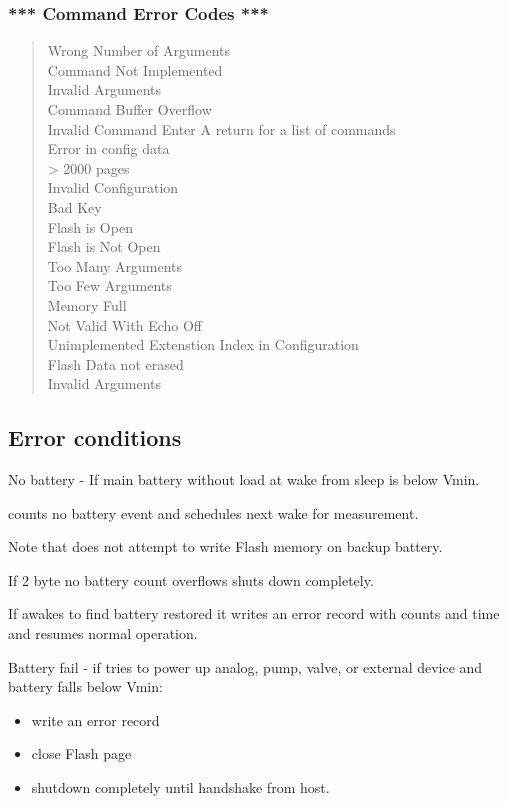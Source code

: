 \subsubsection*{*** Command Error Codes ***}
\begin{quote}
	 Wrong Number of Arguments\\
	 Command Not Implemented\\
	 Invalid Arguments\\
	 Command Buffer Overflow\\
	 Invalid Command Enter A return for a list of commands\\
	 Error in config data\\
	 \textgreater{} 2000 pages\\
	 Invalid Configuration\\
	 Bad Key\\
	 Flash is Open\\
	 Flash is Not Open\\
	 Too Many Arguments\\
	 Too Few Arguments\\
	 Memory Full\\
    	 Not Valid With Echo Off\\
	 Unimplemented Extenstion Index in Configuration\\
	 Flash Data not erased\\
	 Invalid Arguments
\end{quote}

\clearpage

\subsection*{Error conditions}

No battery - If main battery without load at wake from sleep is below
Vmin.

\instType{} counts no battery event and schedules next wake for measurement.

Note that \instType{} does not attempt to write Flash memory on backup battery.

If 2 byte no battery count overflows \instType{} shuts down completely.

If \instType{} awakes to find battery restored it writes an error record with
counts and time and resumes normal operation.

Battery fail - if \instType{} tries to power up analog, pump, valve, or
external device and battery falls below Vmin:
\begin{itemize}
	\item[]
	write an error record
	
	\item[]
	close Flash page
	
	\item[]
	shutdown completely until handshake from host.
\end{itemize}